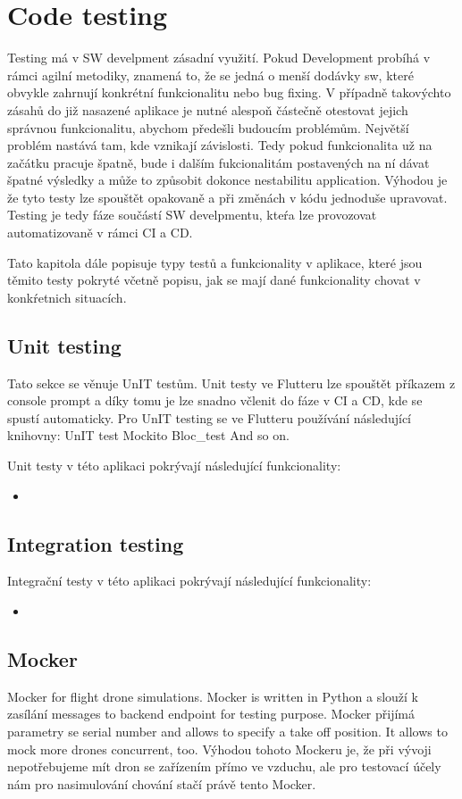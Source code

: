 \section{Code testing}\label{sec:code-testing}
Testing má v SW develpment zásadní využití.
Pokud Development probíhá v rámci agilní metodiky, znamená to, že se jedná o menší dodávky sw, které obvykle zahrnují konkrétní funkcionalitu nebo bug fixing.
V případně takovýchto zásahů do již nasazené aplikace je nutné alespoň částečně otestovat jejich správnou funkcionalitu, abychom předešli budoucím problémům.
Největší problém nastává tam, kde vznikají závislosti.
Tedy pokud funkcionalita už na začátku pracuje špatně, bude i dalším fukcionalitám postavených na ní dávat špatné výsledky a může to způsobit dokonce nestabilitu application.
Výhodou je že tyto testy lze spouštět opakovaně a při změnách v kódu jednoduše upravovat.
Testing je tedy fáze součástí SW develpmentu, kteŕa lze provozovat automatizovaně v rámci CI a CD.

Tato kapitola dále popisuje typy testů a funkcionality v aplikace, které jsou těmito testy pokryté včetně popisu, jak se mají dané funkcionality chovat v konkŕetnich situacích.

\subsection{Unit testing}\label{subsec:unit-testing}
Tato sekce se věnuje  UnIT testům.
Unit testy ve Flutteru lze spouštět příkazem z console prompt a díky tomu je lze snadno včlenit do fáze v CI a CD, kde se spustí automaticky.
Pro UnIT testing se ve Flutteru používání následující knihovny:
UnIT test
Mockito
Bloc\_test
And so on.

Unit testy v této aplikaci pokrývají následující funkcionality:
\begin{itemize}
    \item
\end{itemize}

\subsection{Integration testing}\label{subsec:integration-testing}

Integrační testy v této aplikaci pokrývají následující funkcionality:
\begin{itemize}
    \item
\end{itemize}

\subsection{Mocker}\label{subsec:mocker}
Mocker for flight drone simulations.
Mocker is written in Python a slouží k zasílání messages to backend endpoint for testing purpose.
Mocker přijímá parametry se serial number and allows to specify a take off position.
It allows to mock more drones concurrent, too.
Výhodou tohoto Mockeru je, že při vývoji nepotřebujeme mít dron se zařízením přímo ve vzduchu, ale pro testovací účely nám pro nasimulování chování stačí právě tento Mocker.
